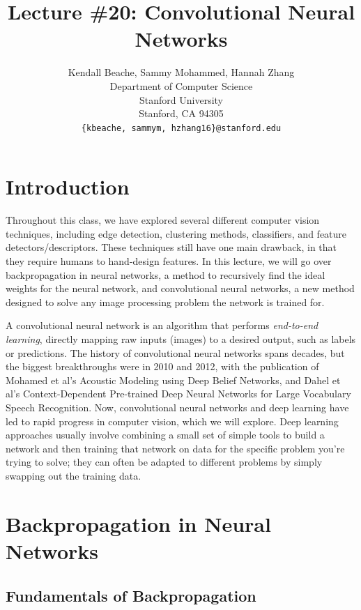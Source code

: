 \documentclass{article}
\title{Lecture \#20: Convolutional Neural Networks}
\author{
Kendall Beache, Sammy Mohammed, Hannah Zhang \\
  Department of Computer Science\\
  Stanford University\\
  Stanford, CA 94305 \\
  \texttt{\{kbeache, sammym, hzhang16\}@stanford.edu} \\
}
\begin{document}
\maketitle

\section{Introduction}
Throughout this class, we have explored several different computer vision techniques, including edge detection, clustering methods, classifiers, and feature detectors/descriptors. These techniques still have one main drawback, in that they require humans to hand-design features. In this lecture, we will go over backpropagation in neural networks, a method to recursively find the ideal weights for the neural network, and convolutional neural networks, a new method designed to solve any image processing problem the network is trained for. 

A convolutional neural network is an algorithm that performs \textit{end-to-end learning}, directly mapping raw inputs (images) to a desired output, such as labels or predictions. The history of convolutional neural networks spans decades, but the biggest breakthroughs were in 2010 and 2012, with the publication of Mohamed et al's  Acoustic Modeling
using Deep Belief Networks, and Dahel et al's Context-Dependent
Pre-trained Deep Neural
Networks for Large Vocabulary
Speech Recognition. Now, convolutional neural networks and deep learning have led to rapid progress in computer vision, which we will explore. Deep learning approaches usually involve combining a small set of simple tools to build a network and then training that network on data for the specific problem you're trying to solve; they can often be adapted to different problems by simply swapping out the training data.

\section{Backpropagation in Neural Networks}


\subsection{Fundamentals of Backpropagation}
\end{document}
